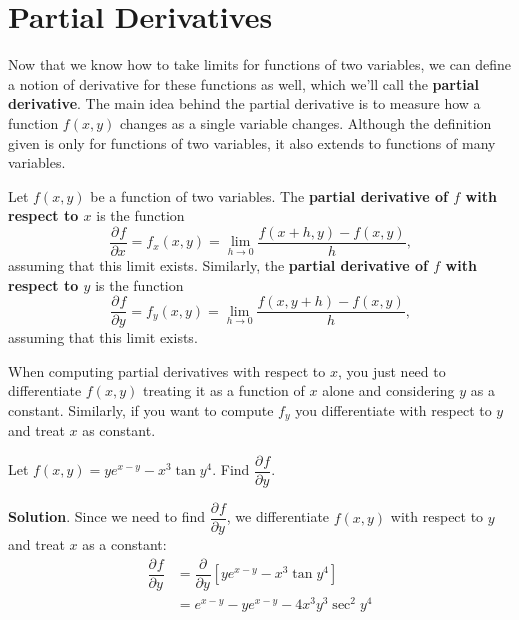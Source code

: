 \documentclass[10pt,]{book}
\newcommand{\terminology}[1]{\textbf{#1}}
\theoremstyle{ptxplainnotitle}
\theoremstyle{ptxplaintitle}
\theoremstyle{ptxplainnotitle}
\theoremstyle{ptxplaintitle}
\theoremstyle{ptxplainnotitle}
\theoremstyle{ptxplaintitle}
\theoremstyle{ptxdefinitionnotitle}
\theoremstyle{ptxdefinitiontitle}
\theoremstyle{ptxdefinitionnotitle}
\theoremstyle{ptxdefinitiontitle}
\theoremstyle{ptxdefinitionnotitle}
\theoremstyle{ptxdefinitiontitle}
\theoremstyle{ptxdefinitionnotitle}
\theoremstyle{ptxdefinitiontitle}
\theoremstyle{ptxdefinitionnotitle}
\theoremstyle{ptxdefinitiontitle}
\numberwithin{equation}{section}
\newcommand{\pdv}[3][]{\dfrac{\partial^{#1} #2}{\partial #3^{#1}}}
\begin{document}
\section[{Partial Derivatives}]{Partial Derivatives}\label{section-partial-derivatives}
Now that we know how to take limits for functions of two variables, we can define a notion of derivative for these functions as well, which we'll call the \terminology{partial derivative}. The main idea behind the partial derivative is to measure how a function \(f(x,y)\) changes as a single variable changes. Although the definition given is only for functions of two variables, it also extends to functions of many variables.\begin{definition}\label{definition-partial-derivatives}
\hypertarget{p-1011}{}%
Let \(f(x,y)\) be a function of two variables. The \terminology{partial derivative of \(f\) with respect to \(x\)} is the function%
\begin{equation*}
\pdv{f}{x} = f_{x}(x,y) = \lim_{h\to0}\frac{f(x+h,y)-f(x,y)}{h}\text{,}
\end{equation*}
assuming that this limit exists. Similarly, the \terminology{partial derivative of \(f\) with respect to \(y\)} is the function%
\begin{equation*}
\pdv{f}{y} = f_{y}(x,y) = \lim_{h\to0}\frac{f(x,y+h)-f(x,y)}{h}\text{,}
\end{equation*}
assuming that this limit exists.%
\end{definition}
\hypertarget{p-1012}{}%
When computing partial derivatives with respect to \(x\), you just need to differentiate \(f(x,y)\) treating it as a function of \(x\) alone and considering \(y\) as a constant. Similarly, if you want to compute \(f_{y}\) you differentiate with respect to \(y\) and treat \(x\) as constant.%
\begin{example}\label{example-213}
\hypertarget{p-1013}{}%
Let \(f(x,y) = ye^{x-y} - x^{3}\tan y^{4}\). Find \(\pdv{f}{y}\).%
\par\smallskip%
\noindent\textbf{Solution}.\hypertarget{solution-155}{}\quad%
\hypertarget{p-1014}{}%
Since we need to find \(\pdv{f}{y}\), we differentiate \(f(x,y)\) with respect to \(y\) and treat \(x\) as a constant:%
\begin{align*}
\pdv{f}{y} & = \pdv{}{y}\left[ye^{x-y} - x^{3}\tan y^{4}\right] \\
& = e^{x-y} - ye^{x-y} - 4x^{3}y^{3}\sec^{2}y^{4} 
\end{align*}
%
\end{example}
\end{document}
